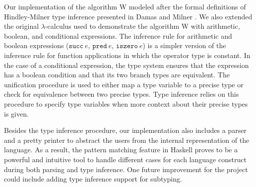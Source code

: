 Our implementation of the algorithm W modeled after the formal 
definitions of Hindley-Milner type inference presented in Damas and Milner \cite{damas}. 
We also extended the original $\lambda$-calculus used to demonstrate the algorithm 
W with arithmetic, boolean, and conditional expressions. The inference rule for 
arithmetic and boolean expressions ($\texttt{succ} \: e$, $\texttt{pred} \: e$, 
$\texttt{iszero} \: e$) is a simpler version of the inference rule for 
function applications in which the operator type is constant. In the case of 
a conditional expression, the type system ensures that the expression 
has a boolean condition and that its two branch types are equivalent. The 
unification procedure is used to either map a type variable to a precise 
type or check for equivalence between two precise types. Type inference 
relies on this procedure to specify type variables when more 
context about their precise types is given. 

Besides the type inference procedure, our implementation also 
includes a parser and a pretty printer to abstract the users 
from the internal representation of the language. As a result, 
the pattern matching feature in Haskell proves to be a powerful 
and intuitive tool to handle different cases for each language construct 
during both parsing and type inference. One future improvement 
for the project could include adding type inference support for subtyping.
